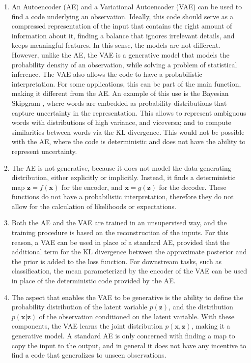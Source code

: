 \documentclass{article}
\begin{document}
\begin{enumerate}
\item An Autoencoder (AE) and a Variational Autoencoder (VAE) can be used to find a code underlying an observation. Ideally, this code should serve as a compressed representation of the input that contains the right amount of information about it, finding a balance that ignores irrelevant details, and keeps meaningful features. In this sense, the models are not different. However, unlike the AE, the VAE is a generative model that models the probability density of an observation, while solving a problem of statistical inference. The VAE also allows the code to have a probabilistic interpretation. For some applications, this can be part of the main function, making it different from the AE. An example of this use is the Bayesian Skipgram \cite{bravzinskas2017embedding}, where words are embedded as probability distributions that capture uncertainty in the representation. This allows to represent ambiguous words with distributions of high variance, and viceversa; and to compute similarities between words via the KL divergence. This would not be possible with the AE, where the code is deterministic and does not have the ability to represent uncertainty.

\item The AE is not generative, because it does not model the data-generating distribution, either explicitly or implicitly. Instead, it finds a deterministic map $\mathbf{z} = f(\mathbf{x})$ for the encoder, and $\mathbf{x} = g(\mathbf{z})$ for the decoder. These functions do not have a probabilistic interpretation, therefore they do not allow for the calculation of likelihoods or expectations.

\item Both the AE and the VAE are trained in an unsupervised way, and the training procedure is based on the reconstruction of the inputs. For this reason, a VAE can be used in place of a standard AE, provided that the additional term for the KL divergence between the approximate posterior and the prior is added to the loss function. For downstream tasks, such as classification, the mean parameterized by the encoder of the VAE can be used in place of the deterministic code provided by the AE.

\item The aspect that enables the VAE to be generative is the ability to define the probability distribution of the latent variable $p(\mathbf{z})$, and the distribution $p(\mathbf{x}\vert\mathbf{z})$ of the observation conditioned on the latent variable. With these components, the VAE learns the joint distribution $p(\mathbf{x},\mathbf{z})$, making it a generative model. A standard AE is only concerned with finding a map to copy the input to the output, and in general it does not have any incentive to find a code that generalizes to unseen observations.
\end{enumerate}
\end{document}
